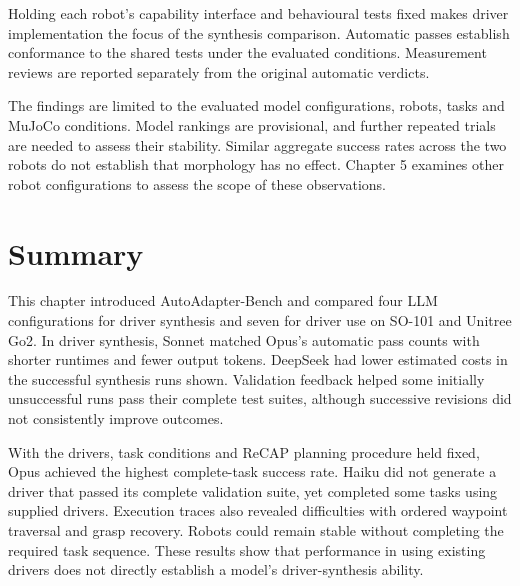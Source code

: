 Holding each robot's capability interface and behavioural tests fixed makes
driver implementation the focus of the synthesis comparison. Automatic passes
establish conformance to the shared tests under the evaluated conditions.
Measurement reviews are reported separately from the original automatic verdicts.

The findings are limited to the evaluated model configurations, robots, tasks
and MuJoCo conditions. Model rankings are provisional, and further repeated
trials are needed to assess their stability. Similar aggregate success rates
across the two robots do not establish that morphology has no effect.
Chapter 5 examines other robot configurations to assess the scope of these
observations.

\section{Summary}

This chapter introduced AutoAdapter-Bench and compared four LLM configurations
for driver synthesis and seven for driver use on SO-101 and Unitree Go2.
In driver synthesis, Sonnet matched Opus's automatic pass counts with shorter
runtimes and fewer output tokens. DeepSeek had lower estimated costs in the
successful synthesis runs shown. Validation feedback helped some initially
unsuccessful runs pass their complete test suites, although successive
revisions did not consistently improve outcomes.

With the drivers, task conditions and ReCAP planning procedure held fixed,
Opus achieved the highest complete-task success rate. Haiku did not generate
a driver that passed its complete validation suite, yet completed some tasks
using supplied drivers. Execution traces also revealed difficulties with
ordered waypoint traversal and grasp recovery. Robots could remain stable
without completing the required task sequence. These results show that
performance in using existing drivers does not directly establish a model's
driver-synthesis ability.
